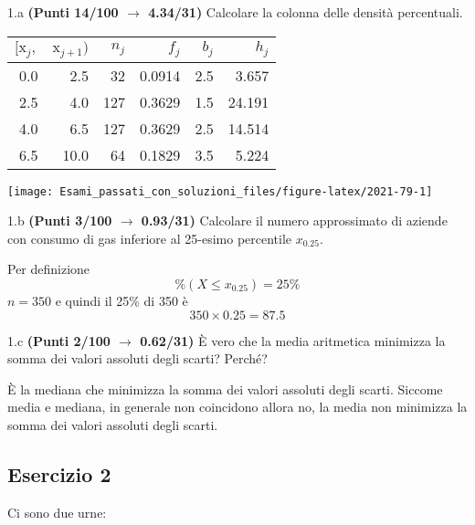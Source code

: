 \documentclass[
  11pt,
]{book}
\theoremstyle{mytheoremstyle}
\theoremstyle{mydefstyle}
\newenvironment{sol}
  {
  \begin{tcolorbox}[enhanced,breakable,arc=0.1mm,boxrule=1pt,colback=white,colframe=iblue,
  title=\bf \fontfamily{lmss}\selectfont \hspace{.5 cm} Soluzione,drop fuzzy shadow]

}{
\end{tcolorbox}
  }
\begin{document}
1.a \textbf{(Punti 14/100 \(\rightarrow\) 4.34/31)} Calcolare la colonna delle densità percentuali.

\begin{sol}

\begin{table}[H]
\centering
\begin{tabular}{rrrrrr}
\toprule
$[\text{x}_j,$ & $\text{x}_{j+1})$ & $n_j$ & $f_j$ & $b_j$ & $h_j$\\
\midrule
0.0 & 2.5 & 32 & 0.0914 & 2.5 & 3.657\\
2.5 & 4.0 & 127 & 0.3629 & 1.5 & 24.191\\
4.0 & 6.5 & 127 & 0.3629 & 2.5 & 14.514\\
6.5 & 10.0 & 64 & 0.1829 & 3.5 & 5.224\\
\bottomrule
\end{tabular}
\end{table}

\begin{center}\texttt{[image: Esami\_passati\_con\_soluzioni\_files/figure-latex/2021-79-1]} \end{center}

\end{sol}

1.b \textbf{(Punti 3/100 \(\rightarrow\) 0.93/31)} Calcolare il numero approssimato di aziende con consumo di gas inferiore al 25-esimo percentile \(x_{0.25}\).

\begin{sol}
Per definizione
\[
\%(X\le x_{0.25})=25\%
\]
\(n=350\) e quindi il 25\% di 350 è
\[
350\times0.25=87.5
\]

\end{sol}

1.c \textbf{(Punti 2/100 \(\rightarrow\) 0.62/31)} È vero che la media aritmetica minimizza la somma dei valori assoluti degli scarti? Perché?

\begin{sol}
È la mediana che minimizza la somma dei valori assoluti degli scarti. Siccome media e mediana, in generale non coincidono allora no, la media non minimizza la somma dei valori assoluti degli scarti.

\end{sol}

\subsection{Esercizio 2}\label{esercizio-2-9}

Ci sono due urne:
\end{document}
